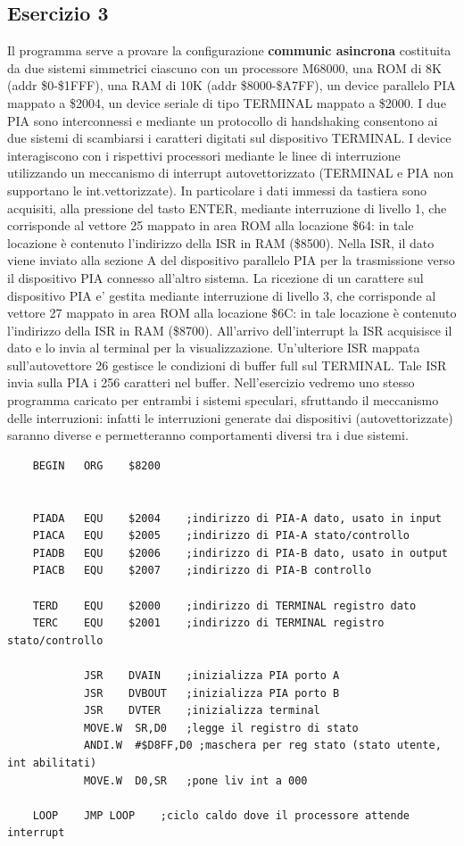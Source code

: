 \subsection{Esercizio 3}
Il programma serve a provare la configurazione \textbf{communic asincrona} costituita da due sistemi simmetrici ciascuno con un processore M68000, una ROM di 8K (addr \$0-\$1FFF), una RAM di 10K (addr \$8000-\$A7FF), un device parallelo PIA mappato a \$2004, un device seriale di tipo TERMINAL mappato a \$2000.
I due PIA sono interconnessi e mediante un protocollo di handshaking consentono ai due sistemi di scambiarsi i caratteri digitati sul dispositivo TERMINAL. I device interagiscono con i rispettivi processori mediante le linee di interruzione utilizzando un meccanismo di  
interrupt autovettorizzato (TERMINAL e PIA non supportano le int.vettorizzate). 
In particolare i dati immessi da tastiera sono acquisiti, alla pressione del tasto ENTER, mediante interruzione di livello 1, che corrisponde al vettore 25 mappato in area ROM alla locazione \$64: in tale locazione è contenuto l'indirizzo della ISR in RAM (\$8500).
Nella ISR, il dato viene inviato alla sezione A del dispositivo parallelo PIA per la trasmissione verso il dispositivo 
PIA connesso all'altro sistema.
La ricezione di un carattere sul dispositivo PIA e' gestita mediante interruzione di livello 3, che corrisponde al vettore 27 mappato in area ROM alla locazione \$6C: in tale locazione è contenuto l'indirizzo della ISR in RAM (\$8700). All'arrivo dell'interrupt la ISR acquisisce il dato e lo invia al terminal per la visualizzazione.
Un'ulteriore ISR mappata sull'autovettore 26 gestisce le condizioni di buffer full sul TERMINAL.
Tale ISR invia sulla PIA i 256 caratteri nel buffer.
Nell'esercizio vedremo uno stesso programma caricato per entrambi i sistemi speculari, sfruttando il meccanismo delle interruzioni: infatti le interruzioni generate dai dispositivi (autovettorizzate) saranno diverse e permetteranno comportamenti diversi tra i due sistemi.


\begin{lstlisting}
    BEGIN	ORG    $8200


    PIADA	EQU    $2004	;indirizzo di PIA-A dato, usato in input
    PIACA	EQU    $2005	;indirizzo di PIA-A stato/controllo
    PIADB	EQU    $2006	;indirizzo di PIA-B dato, usato in output 
    PIACB	EQU    $2007	;indirizzo di PIA-B controllo
    
    TERD	EQU    $2000    ;indirizzo di TERMINAL registro dato
    TERC	EQU    $2001	;indirizzo di TERMINAL registro stato/controllo
    
            JSR    DVAIN	;inizializza PIA porto A
            JSR    DVBOUT	;inizializza PIA porto B
            JSR    DVTER	;inizializza terminal
            MOVE.W	SR,D0	;legge il registro di stato
            ANDI.W	#$D8FF,D0 ;maschera per reg stato (stato utente, int abilitati)
            MOVE.W	D0,SR	;pone liv int a 000
    
    LOOP  	JMP LOOP	;ciclo caldo dove il processore attende interrupt	
\end{lstlisting}

